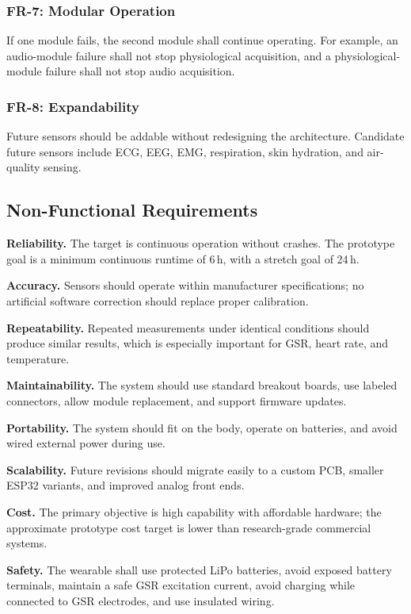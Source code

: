 \subsubsection{FR-7: Modular Operation}
If one module fails, the second module shall continue operating. For example, an audio-module failure shall not stop physiological acquisition, and a physiological-module failure shall not stop audio acquisition.

\subsubsection{FR-8: Expandability}
Future sensors should be addable without redesigning the architecture. Candidate future sensors include ECG, EEG, EMG, respiration, skin hydration, and air-quality sensing.

\subsection{Non-Functional Requirements}
\label{sec:non-functional-requirements}

\textbf{Reliability.} The target is continuous operation without crashes. The prototype goal is a minimum continuous runtime of 6\,h, with a stretch goal of 24\,h.

\textbf{Accuracy.} Sensors should operate within manufacturer specifications; no artificial software correction should replace proper calibration.

\textbf{Repeatability.} Repeated measurements under identical conditions should produce similar results, which is especially important for GSR, heart rate, and temperature.

\textbf{Maintainability.} The system should use standard breakout boards, use labeled connectors, allow module replacement, and support firmware updates.

\textbf{Portability.} The system should fit on the body, operate on batteries, and avoid wired external power during use.

\textbf{Scalability.} Future revisions should migrate easily to a custom PCB, smaller ESP32 variants, and improved analog front ends.

\textbf{Cost.} The primary objective is high capability with affordable hardware; the approximate prototype cost target is lower than research-grade commercial systems.

\textbf{Safety.} The wearable shall use protected LiPo batteries, avoid exposed battery terminals, maintain a safe GSR excitation current, avoid charging while connected to GSR electrodes, and use insulated wiring.

